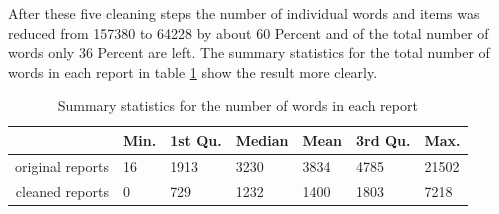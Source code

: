 
After these five cleaning steps the number of individual words and items was reduced from 157380 to 64228 by about 60 Percent and of the total number of words only 36 Percent are left. The summary statistics for the total number of words in each report in table \ref{tab:summaryCR} show the result more clearly. 
\begin{table}[ht]
\centering
\begin{tabular}{rllllll}
  \hline
  & Min. & 1st Qu. & Median  &  Mean & 3rd Qu. &   Max. \\
  \hline
  original reports & 16  &  1913  &  3230 &   3834  &  4785  & 21502  \\ 
  cleaned reports  & 0   &  729  &  1232  &  1400  &  1803  &  7218  \\ 
   \hline
\end{tabular}
\caption{Summary statistics for the number of words in each report}
\label{tab:summaryCR}
\end{table}

